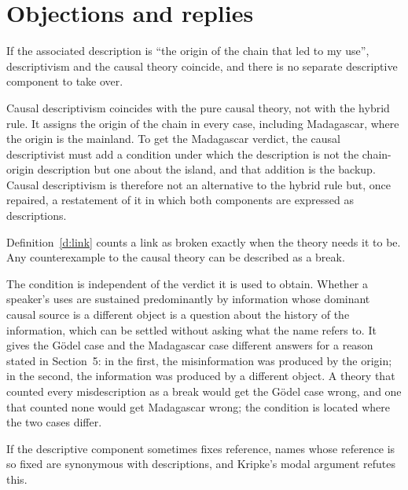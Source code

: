 \documentclass{situationist-preprint}
\begin{document}
\section{Objections and replies}

\begin{objection}
If the associated description is \enquote{the origin of the chain that led to my use}, descriptivism and the causal theory coincide, and there is no separate descriptive component to take over.
\end{objection}

\begin{reply}
Causal descriptivism coincides with the pure causal theory, not with the hybrid rule. It assigns the origin of the chain in every case, including Madagascar, where the origin is the mainland. To get the Madagascar verdict, the causal descriptivist must add a condition under which the description is not the chain-origin description but one about the island, and that addition is the backup. Causal descriptivism is therefore not an alternative to the hybrid rule but, once repaired, a restatement of it in which both components are expressed as descriptions.
\end{reply}

\begin{objection}
Definition~\ref{d:link} counts a link as broken exactly when the theory needs it to be. Any counterexample to the causal theory can be described as a break.
\end{objection}

\begin{reply}
The condition is independent of the verdict it is used to obtain. Whether a speaker's uses are sustained predominantly by information whose dominant causal source is a different object is a question about the history of the information, which can be settled without asking what the name refers to. It gives the G\"odel case and the Madagascar case different answers for a reason stated in Section~5: in the first, the misinformation was produced by the origin; in the second, the information was produced by a different object. A theory that counted every misdescription as a break would get the G\"odel case wrong, and one that counted none would get Madagascar wrong; the condition is located where the two cases differ.
\end{reply}

\begin{objection}
If the descriptive component sometimes fixes reference, names whose reference is so fixed are synonymous with descriptions, and Kripke's modal argument refutes this.
\end{objection}
\end{document}
